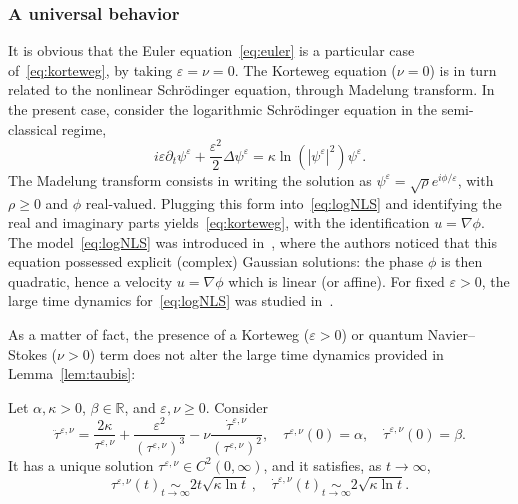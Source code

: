 \documentclass[AHL,Unicode,longabstracts]{cedram}
\newcommand*\R{\mathbb{R}}
\newcommand*\<{\left\langle}
\renewcommand*\>{\right\rangle}
\renewcommand*\ge{\geqslant}
\newcommand*\Eq[2]{\mathop{\sim}\limits_{#1\rightarrow#2}}
\newcommand*\eps{\varepsilon}
\begin{document}
\subsubsection{A universal behavior}

It is obvious that the Euler equation~\eqref{eq:euler} is a particular case of~\eqref{eq:korteweg}, by taking $\eps=\nu=0$. The Korteweg equation ($\nu=0$) is in turn related to the nonlinear Schr\"odinger equation, through Madelung transform. In the present case, consider the logarithmic Schr\"odinger equation in the semi-classical regime,
\begin{equation}\label{eq:logNLS}
i\eps\partial_t \psi^\eps +\frac{\eps^2}{2} \Delta \psi^\eps =\kappa
\ln\left(|\psi^\eps|^2\right)\psi^\eps.
\end{equation}
The Madelung transform consists in writing the solution as $\psi^\eps=\sqrt\rho e^{i\phi/\eps}$, with $\rho\ge 0$ and $\phi$ real-valued. Plugging this form into~\eqref{eq:logNLS} and identifying the real and imaginary parts yields~\eqref{eq:korteweg}, with the identification $u=\nabla \phi$. The model~\eqref{eq:logNLS} was introduced in~\cite{BiMy76}, where the authors noticed that this equation possessed explicit (complex) Gaussian solutions: the phase $\phi$ is then quadratic, hence a velocity $u=\nabla \phi$ which is linear (or affine). For fixed $\eps>0$, the large time dynamics for~\eqref{eq:logNLS} was studied in~\cite{CaGa18}.

As a matter of fact, the presence of a Korteweg ($\eps>0$) or quantum Navier--Stokes ($\nu>0$) term does not alter the large time dynamics provided in Lemma~\ref{lem:taubis}:

\begin{lemm}\label{lem:ODE2}
Let $\alpha,\kappa>0$, $\beta\in \R$, and $\eps,\nu\ge 0$. Consider
\begin{equation}\label{eq:tau-quant}
\ddot \tau^{\eps,\nu} =
\frac{2\kappa }{\tau^{\eps,\nu}}+\frac{\eps^2}{(\tau^{\eps,\nu})^3}-\nu
\frac{\dot \tau^{\eps,\nu}}{(\tau^{\eps,\nu})^2},\quad
\tau^{\eps,\nu}(0)=\alpha,\quad \dot \tau^{\eps,\nu}(0)=\beta.
\end{equation}
It has a unique solution $\tau^{\eps,\nu}\in C^2(0,\infty)$, and it satisfies, as $t\to \infty$,
\begin{equation*}
\tau^{\eps,\nu}(t)\Eq t \infty 2t \sqrt{\kappa \ln t} \,,\quad \dot
\tau^{\eps,\nu}(t)\Eq t \infty 2\sqrt{\kappa\ln t}.
\end{equation*}
\end{lemm}
\end{document}
